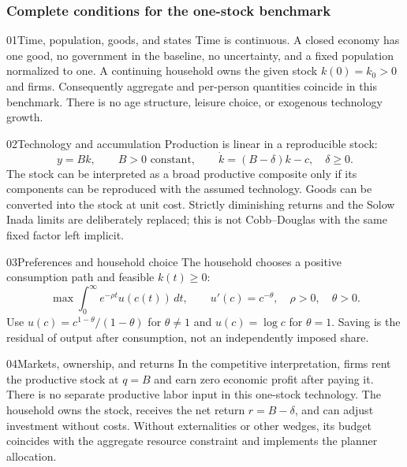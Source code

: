 \subsubsection{Complete conditions for the one-stock benchmark}

\begin{modelsetup}[1]
\begin{modelcondition}{01}{Time, population, goods, and states}
Time is continuous. A closed economy has one good, no government in the
baseline, no uncertainty, and a fixed population normalized to one. A
continuing household owns the given stock $k(0)=k_0>0$ and firms.
Consequently aggregate and per-person quantities coincide in this benchmark.
There is no age structure, leisure choice, or exogenous technology growth.
\end{modelcondition}
\begin{modelcondition}{02}{Technology and accumulation}
Production is linear in a reproducible stock:
\[
y=Bk,\qquad B>0\text{ constant},\qquad
\dot k=(B-\delta)k-c,\quad \delta\geq0.
\]
The stock can be interpreted as a broad productive composite only if its
components can be reproduced with the assumed technology. Goods can be
converted into the stock at unit cost. Strictly diminishing returns and the
Solow Inada limits are deliberately replaced; this is not Cobb--Douglas
with the same fixed factor left implicit.
\end{modelcondition}
\begin{modelcondition}{03}{Preferences and household choice}
The household chooses a positive consumption path and feasible $k(t)\geq0$:
\[
\max\int_0^\infty e^{-\rho t}u(c(t))\,dt,\qquad
u'(c)=c^{-\theta},\quad\rho>0,\quad\theta>0.
\]
Use $u(c)=c^{1-\theta}/(1-\theta)$ for $\theta\ne1$ and $u(c)=\log c$ for
$\theta=1$. Saving is the residual of output after consumption, not an
independently imposed share.
\end{modelcondition}
\begin{modelcondition}{04}{Markets, ownership, and returns}
In the competitive interpretation, firms rent the productive stock at
$q=B$ and earn zero economic profit after paying it. There is no separate
productive labor input in this one-stock technology. The household owns the
stock, receives the net return $r=B-\delta$, and can adjust investment without
costs. Without externalities or other wedges, its budget coincides with the
aggregate resource constraint and implements the planner allocation.
\end{modelcondition}

\end{modelsetup}
